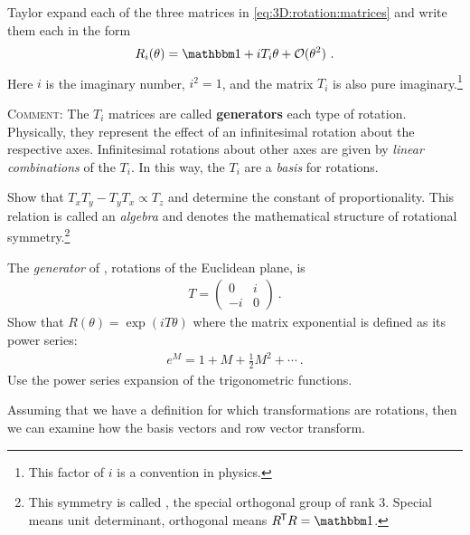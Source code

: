 \begin{exercise}
Taylor expand each of the three matrices in \eqref{eq:3D:rotation:matrices} and write them each in the form
\begin{align}
    R_i(\theta) = \one + i T_i \theta + \mathcal O(\theta^2) \ .
\end{align}
Here $i$ is the imaginary number, $i^2=1$, and the matrix $T_i$ is also pure imaginary.\footnote{This factor of $i$ is a convention in physics.} 

\textsc{Comment:}
The $T_i$ matrices are called \textbf{generators} each type of rotation. Physically, they represent the effect of an infinitesimal rotation about the respective axes. Infinitesimal rotations about other axes are given by \emph{linear combinations} of the $T_i$. In this way, the $T_i$ are a \emph{basis} for rotations.

Show that $T_xT_y - T_y T_x \propto T_z$ and determine the constant of proportionality. This relation is called an \emph{algebra} and denotes the mathematical structure of rotational symmetry.\footnote{This symmetry is called , the special orthogonal group of rank 3. Special means unit determinant, orthogonal means $R^\trans R = \one$.}
\end{exercise}

\begin{exercise}
The \emph{generator} of , rotations of the Euclidean plane, is
\begin{align}
    T = \begin{pmatrix}
        0 & i \\
        -i & 0
    \end{pmatrix} \ .
\end{align}
Show that $R(\theta) = \exp(iT\theta)$ where the matrix exponential is defined as its power series:
\begin{align}
    e^{M} = 1 + M + \frac{1}{2}M^2 + \cdots \ .
\end{align}
Use the power series expansion of the trigonometric functions. 
\end{exercise}

Assuming that we have a definition for which transformations are rotations, then we can examine how the basis vectors and row vector transform.




